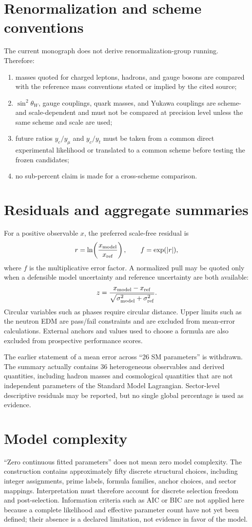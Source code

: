 \section{Renormalization and scheme conventions}
The current monograph does not derive renormalization-group running.  Therefore:
\begin{enumerate}
  \item masses quoted for charged leptons, hadrons, and gauge bosons are compared
  with the reference mass conventions stated or implied by the cited source;
  \item $\sin^2\theta_W$, gauge couplings, quark masses, and Yukawa couplings are
  scheme- and scale-dependent and must not be compared at precision level unless
  the same scheme and scale are used;
  \item future ratios $y_c/y_\mu$ and $y_c/y_t$ must be taken from a common direct
  experimental likelihood or translated to a common scheme before testing the
  frozen candidates;
  \item no sub-percent claim is made for a cross-scheme comparison.
\end{enumerate}

\section{Residuals and aggregate summaries}
For a positive observable $x$, the preferred scale-free residual is
\[
  r=\ln\!\left(\frac{x_{\rm model}}{x_{\rm ref}}\right),
  \qquad
  f=\exp(|r|),
\]
where $f$ is the multiplicative error factor.  A normalized pull may be quoted
only when a defensible model uncertainty and reference uncertainty are both
available:
\[
  z=\frac{x_{\rm model}-x_{\rm ref}}
  {\sqrt{\sigma_{\rm model}^2+\sigma_{\rm ref}^2}}.
\]
Circular variables such as phases require circular distance.  Upper limits such
as the neutron EDM are pass/fail constraints and are excluded from mean-error
calculations.  External anchors and values used to choose a formula are also
excluded from prospective performance scores.

The earlier statement of a mean error across ``26 SM parameters'' is withdrawn.
The summary actually contains 36 heterogeneous observables and derived
quantities, including hadron masses and cosmological quantities that are not
independent parameters of the Standard Model Lagrangian.  Sector-level
descriptive residuals may be reported, but no single global percentage is used
as evidence.

\section{Model complexity}
``Zero continuous fitted parameters'' does not mean zero model complexity.  The
construction contains approximately fifty discrete structural choices,
including integer assignments, prime labels, formula families, anchor choices,
and sector mappings.  Interpretation must therefore account for discrete
selection freedom and post-selection.  Information criteria such as AIC or BIC
are not applied here because a complete likelihood and effective parameter count
have not yet been defined; their absence is a declared limitation, not evidence
in favor of the model.

